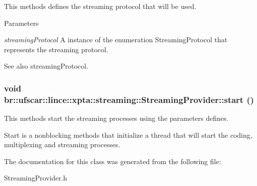 This methods defines the streaming protocol that will be used. 


\begin{DoxyParams}{Parameters}
\item[{\em streamingProtocol}]A instance of the enumeration StreamingProtocol that represents the streaming protocol. \end{DoxyParams}
\begin{DoxySeeAlso}{See also}
streamingProtocol. 
\end{DoxySeeAlso}
\hypertarget{classbr_1_1ufscar_1_1lince_1_1xpta_1_1streaming_1_1StreamingProvider_acea32e698109cd8d558e5b710f74a48e}{
\subsubsection[{start}]{\setlength{\rightskip}{0pt plus 5cm}void br::ufscar::lince::xpta::streaming::StreamingProvider::start ()}}
\label{classbr_1_1ufscar_1_1lince_1_1xpta_1_1streaming_1_1StreamingProvider_acea32e698109cd8d558e5b710f74a48e}


This methods start the streaming processes using the parameters defines. 

Start is a nonblocking methods that initialize a thread that will start the coding, multiplexing and streaming processes. 

The documentation for this class was generated from the following file:\begin{DoxyCompactItemize}
\item 
StreamingProvider.h\end{DoxyCompactItemize}
